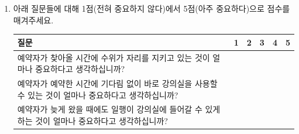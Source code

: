 \documentclass[11pt,a4paper]{article}
\begin{document}
\begin{enumerate}
\begin{center}
\begin{tabular}{ | l | c | c | }
\hline
\end{tabular}
\end{center}
\item 아래 질문들에 대해 1점(전혀 중요하지 않다)에서 5점(아주 중요하다)으로 점수를 매겨주세요.
\begin{center}
\begin{tabular}{ | p{12cm} | c | c | c | c | c | }
\hline
질문 & 1 & 2 & 3 & 4 & 5 \\
\hline
예약자가 찾아올 시간에 수위가 자리를 지키고 있는 것이 얼마나 중요하다고 생각하십니까? & & & & & \\
\hline
예약자가 예약한 시간에 기다림 없이 바로 강의실을 사용할 수 있는 것이 얼마나 중요하다고 생각하십니까? & & & & & \\
\hline
예약자가 늦게 왔을 때에도 일행이 강의실에 들어갈 수 있게 하는 것이 얼마나 중요하다고 생각하십니까? & & & & & \\
\hline
\end{tabular}
\end{center}
\end{enumerate}
\end{document}
